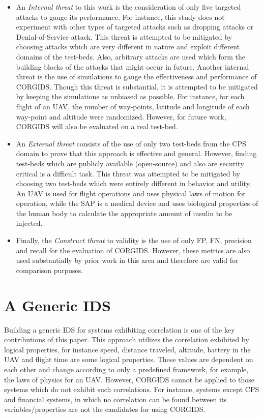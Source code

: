\begin{itemize}
\item An \textit{Internal threat} to this work is the consideration of only five targeted attacks to gauge its performance. For instance, this study does not experiment with other types of targeted attacks such as dropping attacks or Denial-of-Service attack. This threat is attempted to be mitigated by choosing attacks which are very different in nature and exploit different domains of the test-beds. Also, arbitrary attacks are used which form the building blocks of the attacks that might occur in future. Another internal threat is the use of simulations to gauge the effectiveness and performance of \ac{CORGIDS}. Though this threat is substantial, it is attempted to be mitigated by keeping the simulations as unbiased as possible. For instance, for each flight of an \ac{UAV}, the number of way-points, latitude and longitude of each way-point and altitude were randomized. However, for future work, \ac{CORGIDS} will also be evaluated on a real test-bed. 

\item An \textit{External threat} consists of the use of only two test-beds from the \ac{CPS} domain to prove that this approach is effective and general. However, finding test-beds which are publicly available (open-source) and also are security critical is a difficult task. This threat was attempted to be mitigated by choosing two test-beds which were entirely different in behavior and utility. An \ac{UAV} is used for flight operations and uses physical laws of motion for operation, while the SAP is a medical device and uses biological properties of the human body to calculate the appropriate amount of insulin to be injected. 

\item Finally, the \textit{Construct  threat} to validity is the use of only \ac{FP}, \ac{FN}, precision and recall for the evaluation of \ac{CORGIDS}. However, these metrics are also used substantially by prior work in this area and therefore are valid for comparison purposes. 
\end{itemize}

\section{A Generic IDS}
Building a generic \ac{IDS} for systems exhibiting correlation is one of the key contributions of this paper. This approach utilizes the correlation exhibited by logical properties, for instance speed, distance traveled, altitude, battery in the \ac{UAV} and flight time are some logical properties. These values are dependent on each other and change according to only a predefined framework, for example, the laws of physics for an \ac{UAV}. However, \ac{CORGIDS} cannot be applied to those systems which do not exhibit such correlations. For instance, systems except \ac{CPS} and financial systems, in which no correlation can be found between its variables/properties are not the candidates for using \ac{CORGIDS}.

